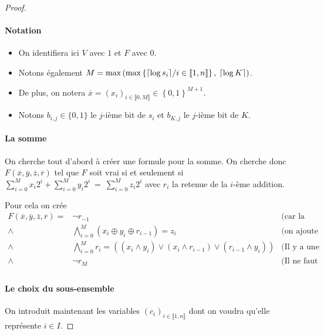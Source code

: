 \begin{proof}
	
	\paragraph{Notation}
	\begin{itemize}
		\item On identifiera ici $V$ avec $1$ et $F$ avec $0$.
		\item Notons également $M = \max \left( \max\left\{ \lceil \log s_i \rceil \middle/ i \in  \llbracket1, n \rrbracket \right\}, \: \lceil \log K \rceil \right)$.
		\item De plus, on notera $\overline{x} = \left(x_i\right)_{i \in  \llbracket0, M \rrbracket} \in \left\{ 0,1\right\}^{M+1}$.
		\item Notons $b_{i,j} \in \{0,1\}$ le $j$-ième bit de $s_i$ et $b_{K, j}$ le $j$-ième bit de $K$.
	\end{itemize}
	
	\paragraph{La somme} On cherche tout d'abord à créer une formule pour la somme. On cherche donc $F(\overline x, \overline y, \overline z , \overline r)$ tel que $F$ soit vrai si et seulement si $\sum\limits_{i = 0}^M x_i2^i + \sum\limits_{i=0}^M y_i 2^i \: = \: \sum\limits_{i=0}^M z_i 2^i$ avec $r_i$ la retenue de la $i$-ème addition.
	
	Pour cela on crée
	$$
	\begin{array}{rll}
		F\left(\overline x, \overline y, \overline z, \overline r\right) = & \neg r_{-1} & \text{(car la retenue d'entrée est 0)}\\
		\wedge & \bigwedge\limits_{i = 0}^{M} \left( x_i \oplus y_i \oplus r_{i-1} \right) = z_i & \text{(on ajoute les deux bits et la retenue précedente)} \\
		\wedge & \bigwedge\limits_{i=0}^{M} r_i = \left( \left(x_i \wedge y_i\right) \vee \left(x_i \wedge r_{i-1}\right) \vee \left(r_{i-1} \wedge y_i\right)\right) & \text{(Il y a une retenue si au moins deux bits étaient 1)}\\
		\wedge & \neg r_M & \text{(Il ne faut pas de dépassement de capacité)}\\
	\end{array}
	$$
	
	\paragraph{Le choix du sous-ensemble} On introduit maintenant les variables $(c_i)_{i\in  \llbracket1, n \rrbracket}$ dont on voudra qu'elle représente $i \in I$.
	

\end{proof}
